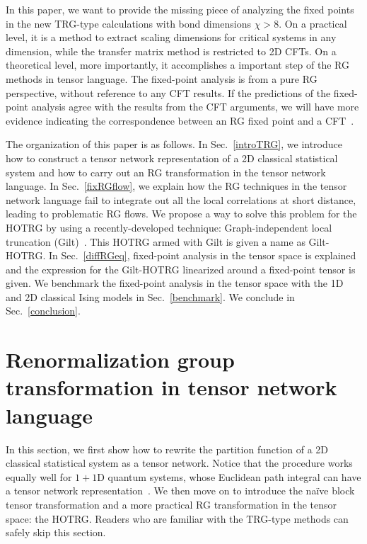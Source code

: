 \documentclass[aps,prb,reprint,superscriptaddress,floatfix]{revtex4-2}
\begin{document}
In this paper, we want to provide the missing piece of analyzing the
fixed points in the new TRG-type calculations with bond dimensions $\chi
> 8$. On a practical level, it is a method to extract scaling dimensions
for critical systems in any dimension, while the transfer matrix method
is restricted to 2D CFTs. On a theoretical level, more importantly, it
accomplishes a important step of the RG methods in tensor language. The
fixed-point analysis is from a pure RG perspective, without reference to
any CFT results. If the predictions of the fixed-point analysis agree
with the results from the CFT arguments, we will have more evidence
indicating the correspondence between an RG fixed point and a
CFT~\cite{poland2019}.
%

The organization of this paper is as follows. In Sec.~\ref{introTRG}, we
introduce how to construct a tensor network representation of a 2D
classical statistical system and how to carry out an RG transformation
in the tensor network language. In Sec.~\ref{fixRGflow}, we explain how
the RG techniques in the tensor network language fail to integrate out
all the local correlations at short distance, leading to problematic RG
flows.  We propose a way to solve this problem for the HOTRG by using a
recently-developed technique: Graph-independent local truncation
(Gilt)~\cite{gilts}. This HOTRG armed with Gilt is given a name as
Gilt-HOTRG.  In Sec.~\ref{diffRGeq}, fixed-point analysis in the tensor
space is explained and the expression for the Gilt-HOTRG linearized
around a fixed-point tensor is given. We benchmark the fixed-point
analysis in the tensor space with the 1D and 2D classical Ising models
in Sec.~\ref{benchmark}. We conclude in Sec.~\ref{conclusion}.

\section{Renormalization group transformation in tensor network
language\label{introTRG}} In this section, we first show how to rewrite
the partition function of a 2D classical statistical system as a tensor
network.  Notice that the procedure works equally well for $1 + 1$D
quantum systems, whose Euclidean path integral can have a tensor network
representation~\cite{GuWen2009}. We then move on to introduce the
na\"ive block tensor transformation and a more practical RG
transformation in the tensor space: the HOTRG. Readers who are familiar
with the TRG-type methods can safely skip this section.
%
\end{document}
